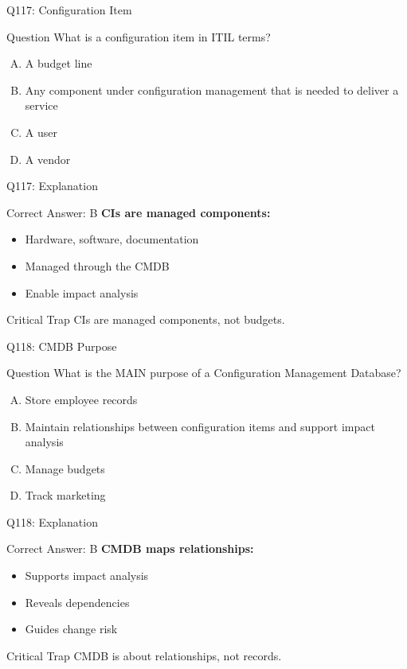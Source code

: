 \documentclass{beamer}
\begin{document}
	\begin{frame}{Q117: Configuration Item}
		\begin{block}{Question}
			What is a configuration item in ITIL terms?
		\end{block}
		\begin{enumerate}[(A)]
			\item A budget line
			\item Any component under configuration management that is needed to deliver a service
			\item A user
			\item A vendor
		\end{enumerate}
	\end{frame}
	
	\begin{frame}{Q117: Explanation}
		\begin{block}{Correct Answer: B}
			\textbf{CIs are managed components:}
			\begin{itemize}
				\item Hardware, software, documentation
				\item Managed through the CMDB
				\item Enable impact analysis
			\end{itemize}
		\end{block}
		\begin{alertblock}{Critical Trap}
			CIs are managed components, not budgets.
		\end{alertblock}
	\end{frame}
	
	\begin{frame}{Q118: CMDB Purpose}
		\begin{block}{Question}
			What is the MAIN purpose of a Configuration Management Database?
		\end{block}
		\begin{enumerate}[(A)]
			\item Store employee records
			\item Maintain relationships between configuration items and support impact analysis
			\item Manage budgets
			\item Track marketing
		\end{enumerate}
	\end{frame}
	
	\begin{frame}{Q118: Explanation}
		\begin{block}{Correct Answer: B}
			\textbf{CMDB maps relationships:}
			\begin{itemize}
				\item Supports impact analysis
				\item Reveals dependencies
				\item Guides change risk
			\end{itemize}
		\end{block}
		\begin{alertblock}{Critical Trap}
			CMDB is about relationships, not records.
		\end{alertblock}
	\end{frame}
	
\end{document}
